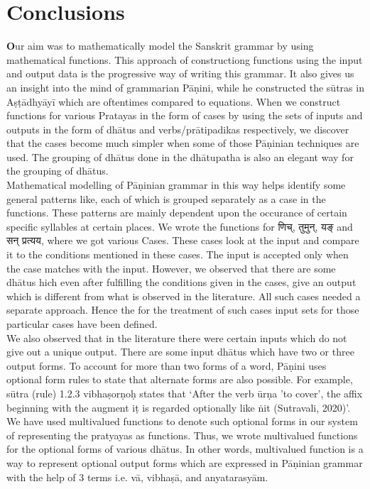 \chapter*{Conclusions}
\label{sec:8}
\lettrine[findent=2pt]{\textbf{O}}{}ur aim was to mathematically model the Sanskrit grammar by using mathematical functions. This approach of constructiong functions using the input and output data is the progressive way of writing this grammar. It also gives us an insight into the mind of grammarian Pāṇini, while he constructed the sūtras in Aṣṭādhyāyī which are oftentimes compared to equations. When we construct functions for various Pratayas in the form of cases by using the sets of inputs and outputs in the form of dhātus and verbs/prātipadikas respectively, we discover that the cases become much simpler when some of those Pāṇinian techniques are used. The grouping of dhātus done in the dhātupatha is also an elegant way for the grouping of dhātus. \\
Mathematical modelling of Pāṇinian grammar in this way helps identify some general patterns like, each of which is grouped separately as a case in the functions. These patterns are mainly dependent upon the occurance of certain specific syllables at certain places. We wrote the functions for \texthindi{णिच्, तुमुन्, यङ् }and \texthindi{सन् प्रत्यय}, where we got various Cases. These cases look at the input and compare it to the conditions mentioned in these cases. The input is accepted only when the case matches with the input. However, we observed that there are some dhātus hich even after fulfilling the conditions given in the cases, give an output which is different from what is observed in the literature. All such cases needed a separate approach. Hence the for the treatment of such cases input sets for those particular cases have been defined. \\
We also observed that in the literature there were certain inputs which do not give out a unique output. There are some input dhātus which have two or three output forms. To account for more than two forms of a word, Pāṇini uses optional form rules to state that alternate forms are also possible. For example, sūtra (rule) 1.2.3 vibhaṣorṇoḥ states that ‘After the verb ūrṇa  
'to cover', the affix beginning with the augment iṭ is regarded optionally like ṅit (Sutravali, 2020)’. We have used multivalued functions to denote such optional forms in our system of representing the pratyayas as functions. Thus, we wrote multivalued functions for the optional forms of various dhātus. In other words, multivalued function is a way to represent optional output forms which are expressed in Pāṇinian grammar with the help of 3 terms i.e. vā, vibhaṣā, and anyatarasyām.\\
